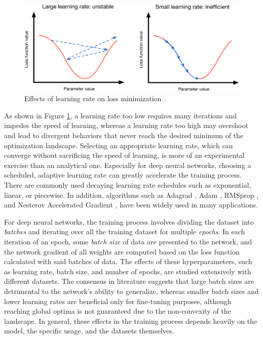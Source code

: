 \begin{figure}[t!]
    \centering
    \includegraphics[width=\textwidth]{figures/lr.png}
    \caption{Effects of learning rate on loss minimization \cite{dl_patterson}.}
    \label{fig:lr}
\end{figure}

As shown in Figure \ref{fig:lr}, a learning rate too low requires many iterations and impedes the speed of learning, whereas a learning rate too high may overshoot and lead to divergent behaviors that never reach the desired minimum of the optimization landscape. Selecting an appropriate learning rate, which can converge without sacrificing the speed of learning, is more of an experimental exercise than an analytical one. Especially for deep neural networks, choosing a scheduled, adaptive learning rate can greatly accelerate the training process. There are commonly used decaying learning rate schedules such as exponential, linear, or piecewise\cite{dl_patterson}. In addition, algorithms such as Adagrad \cite{duchi_adagrad}, Adam \cite{kingma_adam}, RMSprop \cite{hinton_rmsprop}, and Nesterov Accelerated Gradient \cite{nesterov_nag}, have been widely used in many applications. 

For deep neural networks, the training process involves dividing the dataset into \emph{batches} and iterating over all the training dataset for multiple \emph{epochs}. In each iteration of an epoch, some \emph{batch size} of data are presented to the network, and the network gradient of all weights are computed based on the loss function calculated with said batches of data. The effects of these hyperparameters, such as learning rate, batch size, and number of epochs, are studied extensively with different datasets. \cite{batch_size_dynamics, batch_size} The consensus in literature suggests that large batch sizes are detrimental to the network's ability to generalize, whereas smaller batch sizes and lower learning rates are beneficial only for fine-tuning purposes, although reaching global optima is not guaranteed due to the non-convexity of the landscape. In general, these effects in the training process depends heavily on the model, the specific usage, and the datasets themselves. 

